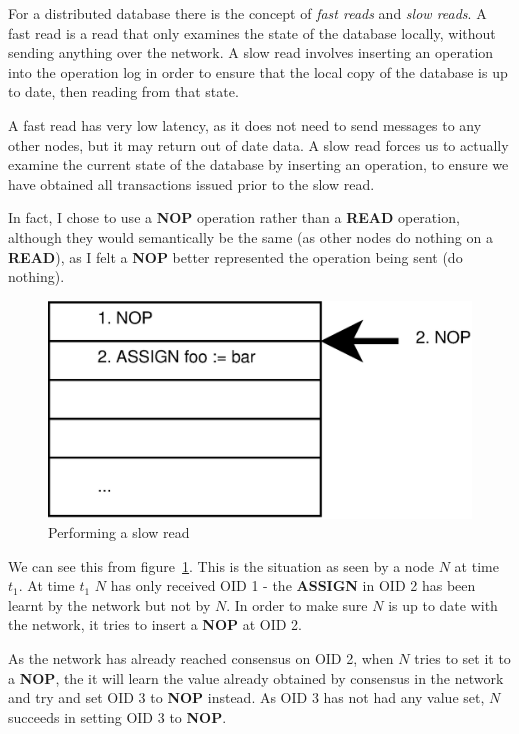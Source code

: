 \documentclass[12pt,twoside,notitlepage]{report}
\newcommand{\op}[1]  {{\bf #1}}         %
\begin{document}
For a distributed database there is the concept of \emph{fast reads} and \emph{slow reads}. A fast
read is a read that only examines the state of the database locally, without sending anything over
the network.  A slow read involves inserting an operation into the operation log in order to
ensure that the local copy of the database is up to date, then reading from that state.

A fast read has very low latency, as it does not need to send messages to any other nodes, but it
may return out of date data. A slow read forces us to actually examine the current state of the
database by inserting an operation, to ensure we have obtained all transactions issued
prior to the slow read.

In fact, I chose to use a \op{NOP} operation rather than a \op{READ} operation, although they
would semantically be the same (as other nodes do nothing on a \op{READ}), as I felt a \op{NOP}
better represented the operation being sent (do nothing).

\begin{figure}[htb]
\centering
\includegraphics[scale=0.5]{figs/op-log-slow-read-1.eps}
\caption{\label{fig:op-log-slow-read-1}Performing a slow read}
\end{figure}

We can see this from figure~\ref{fig:op-log-slow-read-1}. This is the situation as seen by a node
$N$ at time $t_1$. At time $t_1$ $N$ has only received OID 1 - the \op{ASSIGN} in OID 2 has been
learnt by the network but not by $N$. In order to make sure $N$ is up to date with the network, it
tries to insert a \op{NOP} at OID 2.

As the network has already reached consensus on OID 2, when $N$ tries to set it to a \op{NOP}, the
it will learn the value already obtained by consensus in the network and try and set OID 3 to
\op{NOP} instead. As OID 3 has not had any value set, $N$ succeeds in setting OID 3 to \op{NOP}.
\end{document}
